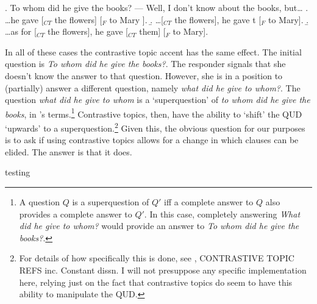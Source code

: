 \documentclass[11pt,letterpaper]{article}
\begin{document}
\ex. 	To whom did he give the books? ---  Well, I don't know about the books, but\ldots
	\a. \ldots he gave [$_{CT}$ the flowers] [$_{F}$ to Mary ].
	\b. \ldots [$_{CT}$ the flowers], he gave t [$_{F}$ to Mary].
	\b. \ldots as for [$_{CT}$ the flowers], he gave [$_{CT}$ them] [$_{F}$ to Mary].
	
In all of these cases the contrastive topic accent has the same effect.
The initial question is {\it To whom did he give the books?}.
The responder signals that she doesn't know the answer to that question.
However, she is in a position to (partially) answer a different question, namely {\it what did he give to whom?}.
The question {\it what did he give to whom} is a `superquestion' of {\it to whom did he give the books}, in \cite{RoQUD}'s terms.\footnote{A question $Q$ is a superquestion of $Q'$ iff a complete answer to $Q$ also provides a complete answer to $Q'$.
In this case, completely answering {\it What did he give to whom?} would provide an answer to {\it To whom did he give the books?}.}
Contrastive topics, then, have the ability to `shift' the QUD `upwards' to a superquestion.\footnote{For details of how specifically this is done, see \cite{RoQUD}, CONTRASTIVE TOPIC REFS inc. Constant dissn. %
I will not presuppose any specific implementation here, relying just on the fact that contrastive topics do seem to have this ability to manipulate the QUD.}
Given this, the obvious question for our purposes is to ask if using contrastive topics allows for a change in which clauses can be elided.
The answer is that it does.

testing

\end{document}
